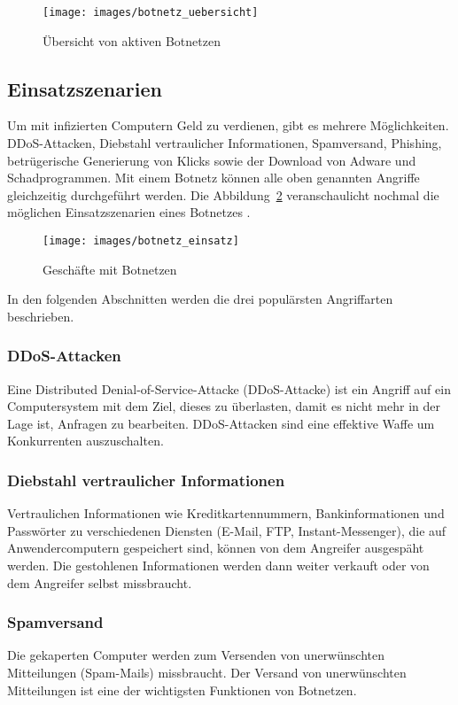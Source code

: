 \begin{figure}
  \centering
  \texttt{[image: images/botnetz\_uebersicht]}
  \caption{Übersicht von aktiven Botnetzen}
  \label{fig:botnetz_uebersicht}
\end{figure} 

\subsection{Einsatzszenarien}
Um mit infizierten Computern Geld zu verdienen, gibt es mehrere Möglichkeiten.
DDoS-Attacken, Diebstahl vertraulicher Informationen, Spamversand, Phishing, 
betrügerische Generierung von Klicks sowie der Download von Adware
und Schadprogrammen. Mit einem Botnetz können alle oben genannten Angriffe 
gleichzeitig durchgeführt werden. Die Abbildung~\ref{fig:botnetz_einsatz}
veranschaulicht nochmal die möglichen Einsatzszenarien eines Botnetzes \cite{namestnikov}.

\begin{figure}
  \centering
  \texttt{[image: images/botnetz\_einsatz]}
  \caption{Geschäfte mit Botnetzen}
  \label{fig:botnetz_einsatz}
\end{figure} 

In den folgenden Abschnitten werden die drei populärsten Angriffarten beschrieben.

\subsubsection{DDoS-Attacken}
Eine Distributed Denial-of-Service-Attacke (DDoS-Attacke) ist ein Angriff auf ein
Computersystem mit dem Ziel, dieses zu überlasten, damit es nicht mehr in der
Lage ist, Anfragen zu bearbeiten. DDoS-Attacken sind eine effektive Waffe um
Konkurrenten auszuschalten.

\subsubsection{Diebstahl vertraulicher Informationen}
Vertraulichen Informationen wie Kreditkartennummern, Bankinformationen und 
Passwörter zu verschiedenen Diensten (E-Mail, FTP, Instant-Messenger), die auf 
Anwendercomputern gespeichert sind, können von dem Angreifer ausgespäht werden.
Die gestohlenen Informationen werden dann weiter verkauft oder von dem Angreifer
selbst missbraucht.

\subsubsection{Spamversand}
Die gekaperten Computer werden zum Versenden von unerwünschten Mitteilungen
(Spam-Mails) missbraucht. Der Versand von unerwünschten Mitteilungen ist eine 
der wichtigsten Funktionen von Botnetzen.


